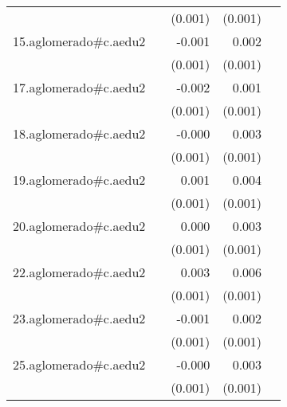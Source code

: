 {\begin{longtable}{l*{4}{D{.}{.}{-1}}}
            &                     &     (0.001)         &     (0.001)         &                     \\
\addlinespace
15.aglomerado#c.aedu2&                     &      -0.001         &       0.002\sym{**} &                     \\
            &                     &     (0.001)         &     (0.001)         &                     \\
\addlinespace
17.aglomerado#c.aedu2&                     &      -0.002         &       0.001         &                     \\
            &                     &     (0.001)         &     (0.001)         &                     \\
\addlinespace
18.aglomerado#c.aedu2&                     &      -0.000         &       0.003\sym{**} &                     \\
            &                     &     (0.001)         &     (0.001)         &                     \\
\addlinespace
19.aglomerado#c.aedu2&                     &       0.001         &       0.004\sym{***}&                     \\
            &                     &     (0.001)         &     (0.001)         &                     \\
\addlinespace
20.aglomerado#c.aedu2&                     &       0.000         &       0.003\sym{***}&                     \\
            &                     &     (0.001)         &     (0.001)         &                     \\
\addlinespace
22.aglomerado#c.aedu2&                     &       0.003\sym{*}  &       0.006\sym{***}&                     \\
            &                     &     (0.001)         &     (0.001)         &                     \\
\addlinespace
23.aglomerado#c.aedu2&                     &      -0.001         &       0.002\sym{**} &                     \\
            &                     &     (0.001)         &     (0.001)         &                     \\
\addlinespace
25.aglomerado#c.aedu2&                     &      -0.000         &       0.003\sym{**} &                     \\
            &                     &     (0.001)         &     (0.001)         &                     \\

\end{longtable}}
